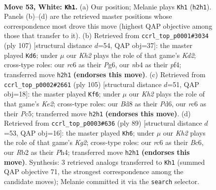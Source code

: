 \documentclass[11pt]{article}
\begin{document}
\clearpage

\begin{figure}[p]\centering
\begin{subfigure}{0.46\textwidth}\centering
\resizebox{\linewidth}{!}{%
\newchessgame
\chessboard[
  setfen={1R1B4/5k2/2r1b3/1p6/rn6/4P1Pp/1R3P1K/8 w - - 0 53},
  showmover=false,
  pgfstyle=straightmove, color=movearrow, markmove={h2-h1}
]}
\caption{}
\end{subfigure}\hfill
\begin{subfigure}{0.46\textwidth}\centering
\resizebox{\linewidth}{!}{%
\newchessgame
\chessboard[
  setfen={8/3k1p1p/6p1/3p4/4rPP1/8/2R1B2r/4KR2 b - - 2 54},
  showmover=false,
  pgfstyle=straightmove, color=movearrow, markmove={d7-d6}
]}
\caption{}
\end{subfigure}
\\[4pt]
\begin{subfigure}{0.46\textwidth}\centering
\resizebox{\linewidth}{!}{%
\newchessgame
\chessboard[
  setfen={8/4k3/r2p4/P1pPn1p1/4Br2/R7/5PK1/4R3 b - - 12 53},
  showmover=false,
  pgfstyle=straightmove, color=movearrow, markmove={e7-f6}
]}
\caption{}
\end{subfigure}\hfill
\begin{subfigure}{0.46\textwidth}\centering
\resizebox{\linewidth}{!}{%
\newchessgame
\chessboard[
  setfen={8/R4pk1/2b3p1/3p4/3B3p/4KP1P/P5r1/8 b - - 1 45},
  showmover=false,
  pgfstyle=straightmove, color=movearrow, markmove={g7-h6}
]}
\caption{}
\end{subfigure}
\caption{\textbf{Move 53, White: \texttt{Kh1}.} (a) Our position; Melanie plays \texttt{Kh1} (\texttt{h2h1}). Panels (b)--(d) are the retrieved master positions whose correspondence most drove this move (highest QAP objective among those that transfer to it). (b) Retrieved from \texttt{ccrl\_top\_p0001\#3034} (ply 107) [structural distance $d$=54, QAP obj=37]: the master played \texttt{Kd6}; under $\mu$ our \emph{Kh2} plays the role of that game's \emph{Kd2}; cross-type roles: our \emph{r}c6 as their \emph{P}g6, our \emph{n}b4 as their \emph{p}f4; transferred move \texttt{h2h1} \textbf{(endorses this move)}. (c) Retrieved from \texttt{ccrl\_top\_p0002\#2661} (ply 105) [structural distance $d$=51, QAP obj=18]: the master played \texttt{Kf6}; under $\mu$ our \emph{Kh2} plays the role of that game's \emph{Ke2}; cross-type roles: our \emph{B}d8 as their \emph{P}d6, our \emph{r}c6 as their \emph{P}c5; transferred move \texttt{h2h1} \textbf{(endorses this move)}. (d) Retrieved from \texttt{ccrl\_top\_p0003\#636} (ply 89) [structural distance $d$=53, QAP obj=16]: the master played \texttt{Kh6}; under $\mu$ our \emph{Kh2} plays the role of that game's \emph{Kg2}; cross-type roles: our \emph{r}c6 as their \emph{B}c6, our \emph{R}b2 as their \emph{P}h4; transferred move \texttt{h2h1} \textbf{(endorses this move)}. Synthesis: 3 retrieved analogs transferred to \texttt{Kh1} (summed QAP objective 71, the strongest correspondence among the candidate moves); Melanie committed it via the \texttt{search} selector.}
\label{fig:thought-m104}
\end{figure}
\end{document}

